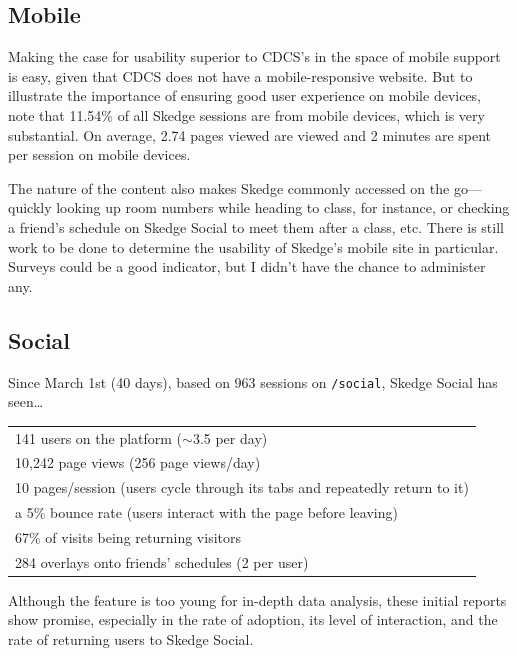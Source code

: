 {\subsection{Mobile}

Making the case for usability superior to CDCS's in the space of mobile support is easy, given that CDCS does not have a mobile-responsive website. But to illustrate the importance of ensuring good user experience on mobile devices, note that 11.54\% of all Skedge sessions are from mobile devices, which is very substantial. On average, 2.74 pages viewed are viewed and 2 minutes are spent per session on mobile devices.

The nature of the content also makes Skedge commonly accessed on the go---quickly looking up room numbers while heading to class, for instance, or checking a friend's schedule on Skedge Social to meet them after a class, etc. There is still work to be done to determine the usability of Skedge's mobile site in particular. Surveys could be a good indicator, but I didn't have the chance to administer any.

\subsection{Social}

Since March 1st (40 days), based on 963 sessions on {\tt /social}, Skedge Social has seen\ldots

{\renewcommand{\arraystretch}{1.5}
\singlespacing
\begin{center}
\begin{tabular}{l}
  \hline
  141 users on the platform ($\sim$3.5 per day) \\
  10,242 page views (256 page views/day)  \\
  10 pages/session (users cycle through its tabs and repeatedly return to it) \\
  a 5\% bounce rate (users interact with the page before leaving) \\
  67\% of visits being returning visitors \\
  284 overlays onto friends’ schedules (2 per user) \\
  \hline
\end{tabular}
\end{center}
\doublespacing

\vspace{5pt}

\noindent Although the feature is too young for in-depth data analysis, these initial reports show promise, especially in the rate of adoption, its level of interaction, and the rate of returning users to Skedge Social.

}}
